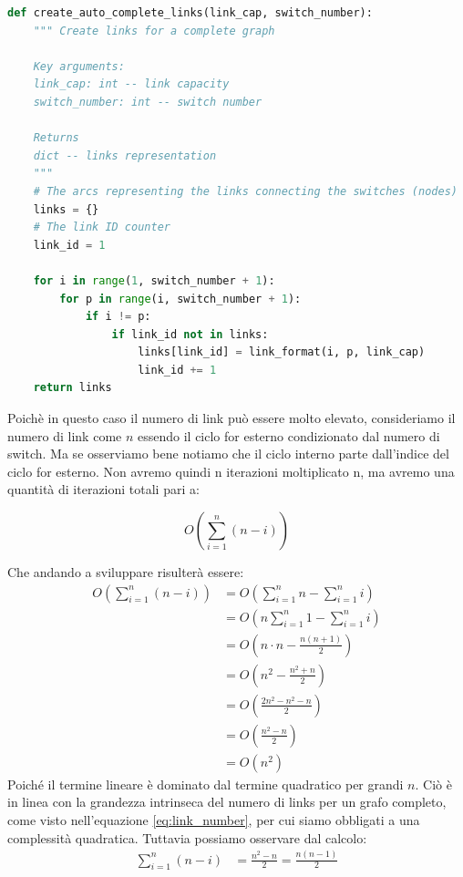 \documentclass[binding=0.6cm]{sapthesis}
\begin{document}
{\scriptsize %
\begin{lstlisting}[language=Python, basicstyle=\ttfamily, caption={funzione per la creazione automatica di un grafo di rete completo}, label={codice:create_auto_complete_links}]
    def create_auto_complete_links(link_cap, switch_number):
    """ Create links for a complete graph 
    
    Key arguments:
    link_cap: int -- link capacity
    switch_number: int -- switch number

    Returns
    dict -- links representation
    """
    # The arcs representing the links connecting the switches (nodes)
    links = {}
    # The link ID counter
    link_id = 1

    for i in range(1, switch_number + 1):
        for p in range(i, switch_number + 1):
            if i != p:
                if link_id not in links:
                    links[link_id] = link_format(i, p, link_cap)
                    link_id += 1
    return links
\end{lstlisting}
} %

Poichè in questo caso il numero di link può essere molto elevato, consideriamo il numero di link come \(n\) essendo il ciclo for esterno condizionato
dal numero di switch. Ma se osserviamo bene notiamo che il ciclo interno parte dall'indice del ciclo for esterno. Non avremo quindi n iterazioni moltiplicato n,
ma avremo una quantità di iterazioni totali pari a:

\begin{equation}
    O\left(\sum_{i=1}^n (n-i)\right)
\end{equation}

Che andando a sviluppare risulterà essere:
\begin{align}
    O\left(\sum_{i=1}^n (n-i)\right) &= O\left(\sum_{i=1}^n n - \sum_{i=1}^n i\right) \\
    &= O\left(n\sum_{i=1}^n 1 - \sum_{i=1}^n i\right) \\
    &= O\left(n \cdot n - \frac{n(n+1)}{2}\right) \\
    &= O\left(n^2 - \frac{n^2 + n}{2}\right) \\
    &= O\left(\frac{2n^2 - n^2 - n}{2}\right) \\
    &= O\left(\frac{n^2 - n}{2}\right) \\
    &= O(n^2) \quad
    \end{align}
Poiché il termine lineare è dominato dal termine quadratico per grandi \( n \). Ciò è in linea con la grandezza intrinseca del numero di links
per un grafo completo, come visto nell'equazione \ref{eq:link_number}, per cui siamo obbligati a una complessità quadratica.
Tuttavia possiamo osservare dal calcolo:
\begin{align*}
    \sum_{i=1}^n (n-i) &= \frac{n^2 - n}{2} = \frac{n(n-1)}{2}
\end{align*}
    
\end{document}
